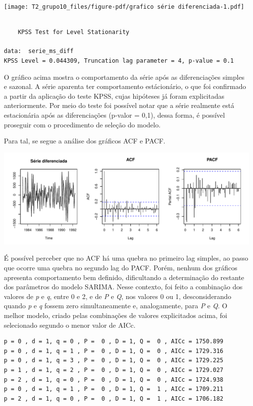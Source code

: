 \documentclass[
  letterpaper,
  DIV=11,
  numbers=noendperiod]{scrartcl}
\begin{document}
\texttt{[image: T2\_grupo10\_files/figure-pdf/grafico série diferenciada-1.pdf]}

\begin{verbatim}

    KPSS Test for Level Stationarity

data:  serie_ms_diff
KPSS Level = 0.044309, Truncation lag parameter = 4, p-value = 0.1
\end{verbatim}

O gráfico acima mostra o comportamento da série após as diferenciações
simples e sazonal. A série aparenta ter comportamento estácionário, o
que foi confirmado a partir da aplicação do teste KPSS, cujas hipóteses
já foram explicitadas anteriormente. Por meio do teste foi possível
notar que a série realmente está estacionária após as diferenciações
(p-valor = 0,1), dessa forma, é possível proseguir com o procedimento de
seleção do modelo.

Para tal, se segue a análise dos gráficos ACF e PACF.

\includegraphics{T2_grupo10_files/figure-pdf/acf-pacf-sem-transformacao BoxCox-1.pdf}

É possível perceber que no ACF há uma quebra no primeiro lag simples, ao
passo que ocorre uma quebra no segundo lag do PACF. Porém, nenhum dos
gráficos apresenta comportamento bem definido, dificultando a
determinação do restante dos parâmetros do modelo SARIMA. Nesse
contexto, foi feito a combinação dos valores de \emph{p} e \emph{q},
entre 0 e 2, e de \emph{P} e \emph{Q}, nos valores 0 ou 1,
desconsiderando quando \emph{p} e \emph{q} fossem zero simultaneamente
e, analogamente, para \emph{P} e \emph{Q}. O melhor modelo, criado pelas
combinações de valores explicitados acima, foi selecionado segundo o
menor valor de AICc.

\begin{verbatim}
p = 0 , d = 1, q = 0 , P =  0 , D = 1, Q =  0 , AICc = 1750.899 
p = 0 , d = 1, q = 1 , P =  0 , D = 1, Q =  0 , AICc = 1729.316 
p = 0 , d = 1, q = 3 , P =  0 , D = 1, Q =  0 , AICc = 1729.225 
p = 1 , d = 1, q = 2 , P =  0 , D = 1, Q =  0 , AICc = 1729.027 
p = 2 , d = 1, q = 0 , P =  0 , D = 1, Q =  0 , AICc = 1724.938 
p = 0 , d = 1, q = 1 , P =  0 , D = 1, Q =  1 , AICc = 1709.211 
p = 2 , d = 1, q = 0 , P =  0 , D = 1, Q =  1 , AICc = 1706.182 
\end{verbatim}
\end{document}
